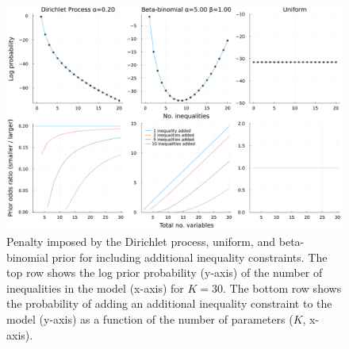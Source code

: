 \documentclass[11pt,a4paper]{article}
\theoremstyle{definition} %
\theoremstyle{case}
\begin{document}
\begin{figure}
    \centering
    \includegraphics[width=\textwidth]{figures/prior_comparison_plot_2x4_without_log_without_betabinomial.pdf}
    \caption{Penalty imposed by the Dirichlet process, uniform, and beta-binomial prior for including additional inequality constraints. The top row shows the log prior probability (y-axis) of the number of inequalities in the model (x-axis) for $K = 30$. The bottom row shows the probability of adding an additional inequality constraint to the model (y-axis) as a function of the number of parameters ($K$, x-axis).}
    \label{fig:scott_berger}
\end{figure}
\end{document}
